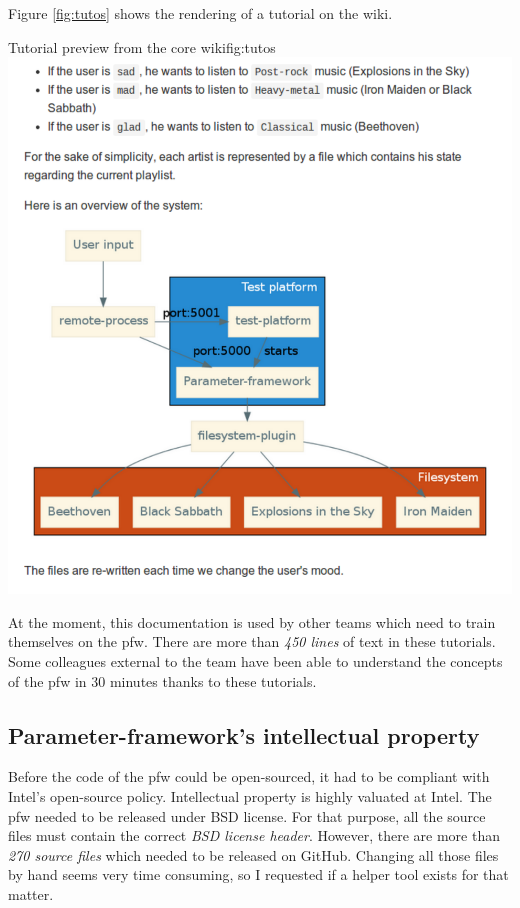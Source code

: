 Figure \ref{fig:tutos} shows the rendering of a tutorial on the wiki.
\begin{figureGraphics}{Tutorial preview from the core wiki}{fig:tutos}
    \includegraphics[height=0.5\textheight]{./src/img/tutos.pdf}
\end{figureGraphics}

At the moment, this documentation is used by other teams which need to train themselves on the \gls{pfw}.
There are more than \emph{450 lines} of text in these tutorials.
Some colleagues external to the team have been able to understand the concepts of the \gls{pfw} in 30 minutes
thanks to these tutorials.


\subsection{Parameter-framework's intellectual property}
Before the code of the \gls{pfw} could be open-sourced, it had to be compliant with Intel's open-source policy.
Intellectual property is highly valuated at Intel. The \gls{pfw} needed to be released under
BSD license.
For that purpose, all the source files must contain the correct \emph{BSD license header}.
However, there are more than \emph{270 source files} which needed to be released on \gls{GitHub}.
Changing all those files by hand seems very time consuming, so I requested if a helper tool exists for that matter.

